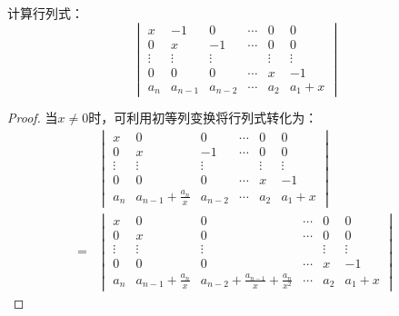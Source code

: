 \begin{problem}
计算行列式：
\begin{equation*}
    \begin{vmatrix}
        x      & -1      & 0       & \cdots & 0      & 0      \\
        0      & x       & -1      & \cdots & 0      & 0      \\
        \vdots & \vdots  & \vdots  &        & \vdots & \vdots \\
        0      & 0       & 0       & \cdots & x      & -1     \\
        a_n    & a_{n-1} & a_{n-2} & \cdots & a_2    & a_1+x
    \end{vmatrix}
\end{equation*}
\end{problem}
\begin{proof}
    当\(x\neq0\)时，可利用初等列变换将行列式转化为：
    \begin{align*}
          &
        \begin{vmatrix}
            x      & 0                     & 0       & \cdots & 0      & 0      \\
            0      & x                     & -1      & \cdots & 0      & 0      \\
            \vdots & \vdots                & \vdots  &        & \vdots & \vdots \\
            0      & 0                     & 0       & \cdots & x      & -1     \\
            a_n    & a_{n-1}+\frac{a_n}{x} & a_{n-2} & \cdots & a_2    & a_1+x
        \end{vmatrix}                                                                                                       \\
        = &
        \begin{vmatrix}
            x      & 0                     & 0                                         & \cdots & 0      & 0      \\
            0      & x                     & 0                                         & \cdots & 0      & 0      \\
            \vdots & \vdots                & \vdots                                    &        & \vdots & \vdots \\
            0      & 0                     & 0                                         & \cdots & x      & -1     \\
            a_n    & a_{n-1}+\frac{a_n}{x} & a_{n-2}+\frac{a_{n-1}}{x}+\frac{a_n}{x^2} & \cdots & a_2    & a_1+x

\end{vmatrix}
\end{align*}
\end{proof}
